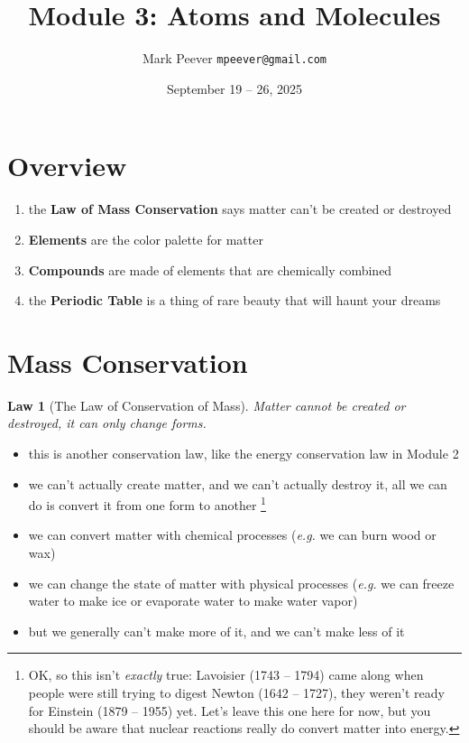 \documentclass[11pt, oneside]{article}   	%
\title{Module 3: Atoms and Molecules }
\author{Mark Peever \texttt{mpeever@gmail.com}}
\date{September 19 -- 26, 2025}
\newtheorem{law}{Law}
\begin{document}
\maketitle

\begin{center}

\end{center}

\section{Overview}
\begin{enumerate}
\item the \textbf{Law of Mass Conservation} says matter can't be created or destroyed
\item \textbf{Elements} are the color palette for matter
\item \textbf{Compounds} are made of elements that are chemically combined
\item the \textbf{Periodic Table} is a thing of rare beauty that will haunt your dreams
\end{enumerate}

\section{Mass Conservation}

\begin{law}[The Law of Conservation of Mass]\label{law-conservation-mass}
Matter cannot be created or destroyed, it can only change forms.
\end{law}

\begin{itemize}
\item this is another conservation law, like the energy conservation law in Module 2
\item we can't actually create matter, and we can't actually destroy it, all we can do is convert it from one form to another
\footnote{OK, so this isn't \emph{exactly} true: Lavoisier (1743 -- 1794) came along when people were still trying to digest Newton (1642 -- 1727), they weren't ready for Einstein (1879 -- 1955) yet. Let's leave this one here for now, but you should be aware that nuclear reactions really do convert matter into energy.}
\item we can convert matter with chemical processes (\emph{e.g.} we can burn wood or wax)
\item we can change the state of matter with physical processes (\emph{e.g.} we can freeze water to make ice or evaporate water to make water vapor)
\item but we generally can't make more of it, and we can't make less of it
\end{itemize}
\end{document}
